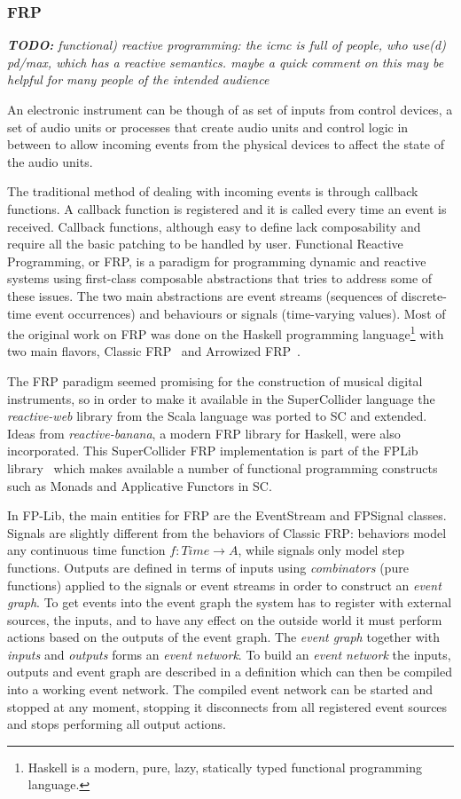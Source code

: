 \documentclass{article}
\newcommand{\todo}[1] {\emph{\textbf{TODO:} #1}}
\begin{document}
\subsubsection{FRP}

\todo{functional) reactive programming: the icmc is full of people, who
use(d) pd/max, which has a reactive semantics. maybe a quick comment on
this may be helpful for many people of the intended audience}

An electronic instrument can be though of as set of inputs from control devices, a set of audio units or processes that create audio units and control logic in between to allow incoming events from the physical devices to affect the state of the audio units. 

The traditional method of dealing with incoming events is through callback functions. A callback function is registered and it is called every time an event is received. Callback functions, although easy to define lack composability and require all the basic patching to be handled by user. Functional Reactive Programming, or FRP, is a paradigm for programming dynamic and reactive systems using first-class composable abstractions that tries to address some of these issues. The two main abstractions are event streams (sequences of discrete-time event occurrences) and behaviours or signals (time-varying values). Most of the original work on FRP was done on the Haskell programming language\footnote{Haskell is a modern, pure, lazy, statically typed functional programming language.} with two main flavors, Classic FRP~\cite{elliott1997-fun,elliott2009-pus} and Arrowized FRP~\cite{hudak2003-arr,courtney2003yampa}.

The FRP paradigm seemed promising for the construction of musical digital instruments, so in order to make it available in the SuperCollider language the \emph{reactive-web} library from the Scala language was ported to SC and extended. Ideas from \emph{reactive-banana}, a modern FRP library for Haskell, were also incorporated. This SuperCollider FRP implementation is part of the FPLib library~\cite{-fpl} which makes available a number of functional programming constructs such as Monads and Applicative Functors in SC.
 
In FP-Lib, the main entities for FRP are the EventStream and FPSignal classes. Signals are slightly different from the behaviors of Classic FRP: behaviors model any continuous time function $f:Time\rightarrow A$, while signals only model step functions.  Outputs are defined in terms of inputs using \emph{combinators} (pure functions) applied to the signals or event streams in order to construct an \emph{event graph}. To get events into the event graph the system has to register with external sources, the inputs, and to have any effect on the outside world it must perform actions based on the outputs of the event graph. The \emph{event graph} together with \emph{inputs} and \emph{outputs} forms an \emph{event network}. To build an \emph{event network} the inputs, outputs and event graph are described in a definition which can then be compiled into a working event network. The compiled event network can be started and stopped at any moment, stopping it disconnects from all registered event sources and stops performing all output actions.
\end{document}
